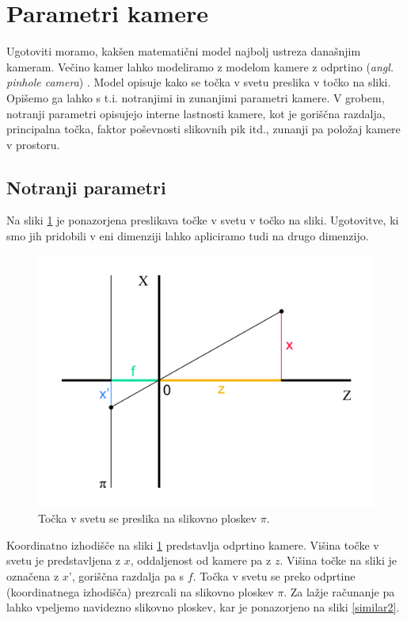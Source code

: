 \documentclass[a4paper, 12pt]{book}
\begin{document}
\section{Parametri kamere}\label{parametri}
Ugotoviti moramo, kakšen matematični model najbolj ustreza današnjim kameram. Večino kamer lahko modeliramo z modelom kamere z odprtino (\emph{angl. pinhole camera}) \cite{Hartley2004, zhang2000flexible, zhang1995robust}. Model opisuje kako se točka v svetu preslika v točko na sliki. Opišemo ga lahko s t.i. notranjimi in zunanjimi parametri kamere. V grobem, notranji parametri opisujejo interne lastnosti kamere, kot je goriščna razdalja, principalna točka, faktor poševnosti slikovnih pik itd., zunanji pa položaj kamere v prostoru.

\subsection{Notranji parametri}
Na sliki \ref{similar1} je ponazorjena preslikava točke v svetu v točko na sliki. Ugotovitve, ki smo jih pridobili v eni dimenziji lahko apliciramo tudi na drugo dimenzijo. 

\begin{figure}[H]
\centering
\includegraphics[width=\textwidth,height=\textheight,keepaspectratio]{similar_triangles_1.png}
\caption{Točka v svetu se preslika na slikovno ploskev $\pi$.}
\label{similar1}
\end{figure}

Koordinatno izhodišče na sliki \ref{similar1} predstavlja odprtino kamere. Višina točke v svetu je predstavljena z $x$, oddaljenost od kamere pa z $z$. Višina točke na sliki je označena z $x’$, goriščna razdalja pa s $f$. Točka v svetu se preko odprtine (koordinatnega izhodišča) prezrcali na slikovno ploskev $\pi$. Za lažje računanje pa lahko vpeljemo navidezno slikovno ploskev, kar je ponazorjeno na sliki \ref{similar2}.
\end{document}
